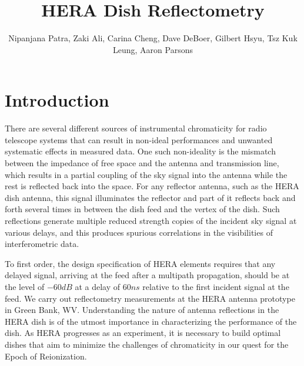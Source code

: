 \documentclass[12pt,preprint]{aastex}
\begin{document}
\title{HERA Dish Reflectometry} 
\author{Nipanjana Patra, Zaki Ali, Carina Cheng, Dave DeBoer, Gilbert Hsyu, Tsz Kuk Leung, Aaron Parsons}
\maketitle

\section{Introduction}

There are several different sources of instrumental chromaticity for radio
telescope systems that can result in non-ideal performances and unwanted
systematic effects in measured data. One such non-ideality is the mismatch
between the impedance of free space and the antenna and transmission line,
which results in a partial coupling of the sky signal into the antenna while
the rest is reflected back into the space. For any reflector antenna, such as the HERA
dish antenna, this signal illuminates the reflector and part of it reflects
back and forth several times in between the dish feed and the vertex of the
dish.  Such reflections generate multiple reduced strength copies of the
incident sky signal at various delays, and this produces spurious correlations
in the visibilities of interferometric data. 




To first order, the design specification of HERA elements requires that any delayed signal, arriving at the feed after a multipath propagation, should be at the level of $-60dB$ at a delay of $60ns$ relative to the first
incident signal at the feed. We carry out reflectometry measurements at the HERA antenna prototype in Green Bank, WV. Understanding the nature of antenna reflections in the HERA dish is of the
utmost importance in characterizing the performance of the dish. As HERA
progresses as an experiment, it is necessary to build optimal dishes that aim
to minimize the challenges of chromaticity in our quest for the Epoch of
Reionization.
\end{document}
